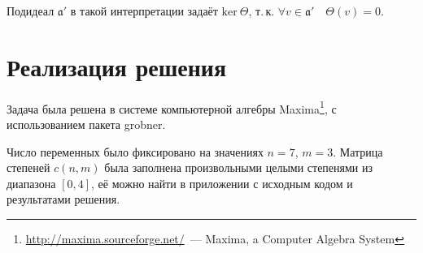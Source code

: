 \documentclass[a4paper,12pt]{article}
\begin{document}
Подидеал $\mathfrak{a}'$ в такой интерпретации задаёт $\textrm{ker}\ \Theta$, т.\,к. $\forall v \in \mathfrak{a}' \quad \Theta(v) = 0$.

\section{Реализация решения}
Задача была решена в системе компьютерной алгебры 
Maxima\footnote{\url{http://maxima.sourceforge.net/}~--- Maxima, a Computer Algebra System}, 
с использованием пакета grobner.

Число переменных было фиксировано на значениях $n = 7$, $m = 3$.
Матрица степеней $c(n, m)$ была заполнена произвольными целыми степенями из диапазона $[0, 4]$,
её можно найти в приложении с исходным кодом и результатами решения.


\end{document}
